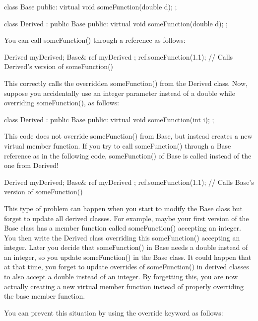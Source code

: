 \begin{cpp}
class Base
{
    public:
    virtual void someFunction(double d);
};

class Derived : public Base
{
    public:
    virtual void someFunction(double d);
};
\end{cpp}

You can call someFunction() through a reference as follows:

\begin{cpp}
Derived myDerived;
Base& ref { myDerived };
ref.someFunction(1.1); // Calls Derived's version of someFunction()
\end{cpp}

This correctly calls the overridden someFunction() from the Derived class. Now, suppose you accidentally use an integer parameter instead of a double while overriding someFunction(), as follows:

\begin{cpp}
class Derived : public Base
{
    public:
        virtual void someFunction(int i);
};
\end{cpp}

This code does not override someFunction() from Base, but instead creates a new virtual member function. If you try to call someFunction() through a Base reference as in the following code, someFunction() of Base is called instead of the one from Derived!

\begin{cpp}
Derived myDerived;
Base& ref { myDerived };
ref.someFunction(1.1); // Calls Base's version of someFunction()
\end{cpp}

This type of problem can happen when you start to modify the Base class but forget to update all derived classes. For example, maybe your first version of the Base class has a member function called someFunction() accepting an integer. You then write the Derived class overriding this someFunction() accepting an integer. Later you decide that someFunction() in Base needs a double instead of an integer, so you update someFunction() in the Base class. It could happen that at that time, you forget to update overrides of someFunction() in derived classes to also accept a double instead of an integer. By forgetting this, you are now actually creating a new virtual member function instead of properly overriding the base member function.

You can prevent this situation by using the override keyword as follows:

